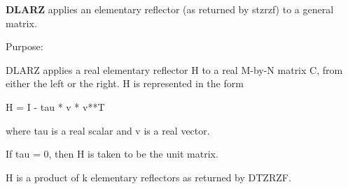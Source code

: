 {\bfseries D\+L\+A\+R\+Z} applies an elementary reflector (as returned by stzrzf) to a general matrix. 

 \begin{DoxyParagraph}{Purpose\+: }
\begin{DoxyVerb} DLARZ applies a real elementary reflector H to a real M-by-N
 matrix C, from either the left or the right. H is represented in the
 form

       H = I - tau * v * v**T

 where tau is a real scalar and v is a real vector.

 If tau = 0, then H is taken to be the unit matrix.


 H is a product of k elementary reflectors as returned by DTZRZF.\end{DoxyVerb}
 
\end{DoxyParagraph}

